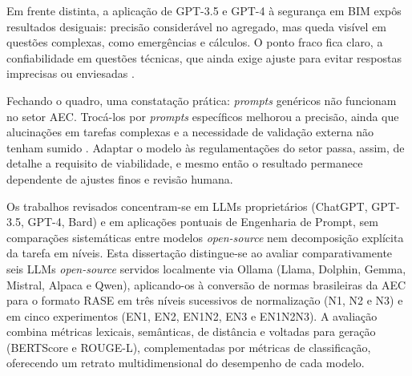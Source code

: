 Em frente distinta, a aplicação de GPT-3.5 e GPT-4 à segurança em BIM expôs resultados desiguais: precisão considerável no agregado, mas queda visível em questões complexas, como emergências e cálculos. O ponto fraco fica claro, a confiabilidade em questões técnicas, que ainda exige ajuste para evitar respostas imprecisas ou enviesadas \cite{sammou2024}.

Fechando o quadro, uma constatação prática: \textit{prompts} genéricos não funcionam no setor AEC. Trocá-los por \textit{prompts} específicos melhorou a precisão, ainda que alucinações em tarefas complexas e a necessidade de validação externa não tenham sumido \cite{samsami2024}. Adaptar o modelo às regulamentações do setor passa, assim, de detalhe a requisito de viabilidade, e mesmo então o resultado permanece dependente de ajustes finos e revisão humana.

Os trabalhos revisados concentram-se em LLMs proprietários (ChatGPT, GPT-3.5, GPT-4, Bard) e em aplicações pontuais de Engenharia de Prompt, sem comparações sistemáticas entre modelos \textit{open-source} nem decomposição explícita da tarefa em níveis. Esta dissertação distingue-se ao avaliar comparativamente seis LLMs \textit{open-source} servidos localmente via Ollama (Llama, Dolphin, Gemma, Mistral, Alpaca e Qwen), aplicando-os à conversão de normas brasileiras da AEC para o formato RASE em três níveis sucessivos de normalização (N1, N2 e N3) e em cinco experimentos (EN1, EN2, EN1N2, EN3 e EN1N2N3). A avaliação combina métricas lexicais, semânticas, de distância e voltadas para geração (BERTScore e ROUGE-L), complementadas por métricas de classificação, oferecendo um retrato multidimensional do desempenho de cada modelo.